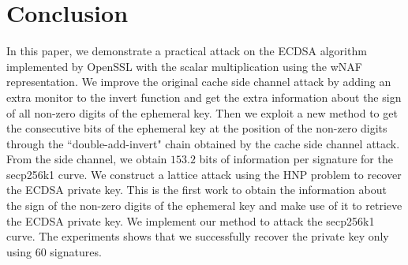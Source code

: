 \section{Conclusion}
\label{sec:conclusion}
In this paper, we demonstrate a practical attack on the ECDSA algorithm implemented by OpenSSL with the scalar multiplication using the wNAF representation.
We improve the original cache side channel attack by adding an extra monitor to the invert function and get the extra information about the sign of all non-zero digits of the ephemeral key.
Then we exploit a new method to get the consecutive bits of the ephemeral key at the position of the non-zero digits through the ``double-add-invert" chain obtained by the cache side channel attack.
From the side channel, we obtain $153.2$ bits of information per signature for the secp256k1 curve.
We construct a lattice attack using the HNP problem to recover the ECDSA private key.
This is the first work to obtain the information about the sign of the non-zero digits of the ephemeral key and make use of it to retrieve the ECDSA private key.
We implement our method to attack the secp256k1 curve.
The experiments shows that we successfully recover the private key only using $60$ signatures.


